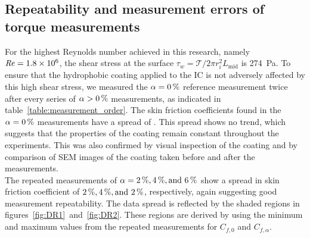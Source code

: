 \subsection{Repeatability and measurement errors of torque measurements}
For the highest Reynolds number achieved in this research, namely $\mbox{\textit{Re}} = 1.8\times10^6$, the shear stress at the surface $\tau_w = \mathcal{T} / 2 \pi r_i^2 L_\text{mid}$ is \SI{274}{\Pa}. To ensure that the {hydrophobic} coating applied to the IC is not adversely affected by this high shear stress, we measured the $\alpha = \SI{0}{\percent}$ reference measurement twice after every series of $\alpha > \SI{0}{\percent}$ measurements, as indicated in table~\ref{table:measurement_order}. The skin friction coefficients found in the $\alpha = \SI{0}{\percent}$ measurements have a spread of . This spread shows no trend, which suggests that the properties of the coating remain constant throughout the experiments. This was also confirmed by visual inspection of the coating and by comparison of SEM images of the coating taken before and after the measurements.  \\
The repeated measurements of $\alpha = \SI{2}{\percent}, \SI{4}{\percent}, \text{and } \SI{6}{\percent}$ show a spread in skin friction coefficient of $\SI{2}{\percent}, \SI{4}{\percent}, \text{and } \SI{2}{\percent}$, respectively, again suggesting good measurement repeatability.  The data spread is reflected by the shaded regions in figures~\ref{fig:DR1}~and~\ref{fig:DR2}. These regions are derived by using the minimum and maximum values from the repeated measurements for $C_{f,0}$ and $C_{f,\alpha}$.


